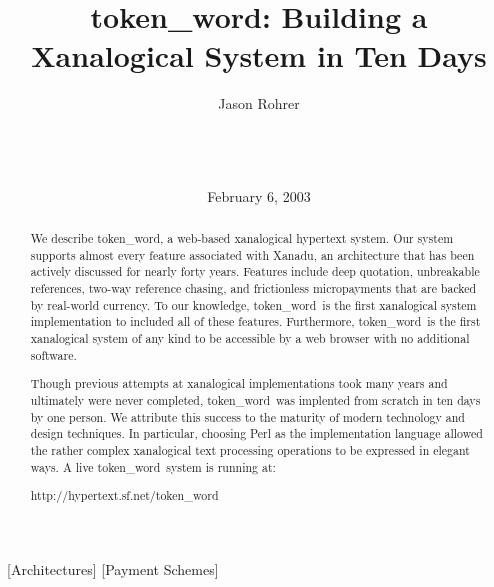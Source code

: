 \documentclass{acm_proc_article-sp}
\newcommand{\tw}{token\_word}
\begin{document}
\title{\tw:  Building a Xanalogical System in Ten Days}


\author{
\alignauthor Jason Rohrer\\
    \\
    \\
    \\
}

\date{February 6, 2003}


\maketitle

\begin{abstract}
We describe \tw, a web-based xanalogical hypertext system.  Our system supports almost every feature associated with Xanadu, an architecture that has been actively discussed for nearly forty years.
Features include deep quotation, unbreakable references, two-way reference chasing, and frictionless micropayments that are backed by real-world currency.
To our knowledge, \tw \ is the first xanalogical system implementation to included all of these features.  Furthermore, \tw \ is the first xanalogical system of any kind to be accessible by a web browser with no additional software.

Though previous attempts at xanalogical implementations took many years and ultimately were never completed, \tw \ was implented from scratch in ten days by one person.  
We attribute this success to the maturity of modern technology and design techniques.  
In particular, choosing Perl as the implementation language allowed the rather complex xanalogical text processing operations to be expressed in elegant ways.
A live \tw \ system is running at:
\begin{center}
http://hypertext.sf.net/token\_word
\end{center}
\end{abstract}

[Architectures]
[Payment Schemes]



\end{document}
